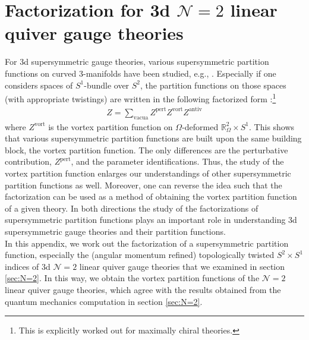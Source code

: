 \documentclass[a4paper,11pt]{article}
\begin{document}
\appendix

\section{Factorization for 3d $\mathcal N = 2$ linear quiver gauge theories}
\label{sec:fact}

For 3d supersymmetric gauge theories, various supersymmetric partition functions on curved 3-manifolds have been studied, e.g., \cite{Kim:2009wb,Kapustin:2009kz,Jafferis:2010un,Hama:2010av,Imamura:2011su,Hama:2011ea,Kapustin:2011jm,Benini:2011nc,Imamura:2011wg,Alday:2012au,Benini:2015noa,Benini:2016hjo,Closset:2016arn}. Especially if one considers spaces of $S^1$-bundle over $S^2$, the partition functions on those spaces (with appropriate twistings) are written in the following factorized form \cite{Krattenthaler:2011da,Dimofte:2011ju,Pasquetti:2011fj,Beem:2012mb,Hwang:2012jh,Taki:2013opa,Cecotti:2013mba,Fujitsuka:2013fga,Benini:2013yva,Benini:2015noa}:\footnote{This is explicitly worked out for maximally chiral \cite{Benini:2011mf} theories.}
\begin{align}
Z = \sum_\text{vacua} Z^\text{pert} Z^\text{vort} Z^\text{antiv}
\end{align}
where $Z^\text{vort}$ is the vortex partition function on $\Omega$-deformed $\mathbb R^2_\Omega \times S^1$. This shows that various supersymmetric partition functions are built upon the same building block, the vortex partition function. The only differences are the perturbative contribution, $Z^\text{pert}$, and the parameter identifications. Thus, the study of the vortex partition function enlarges our understandings of other supersymmetric partition functions as well. Moreover, one can reverse the idea such that the factorization can be used as a method of obtaining the vortex partition function of a given theory. In both directions the study of the factorizations of supersymmetric partition functions plays an important role in understanding 3d supersymmetric gauge theories and their partition functions.
\\


In this appendix, we work out the factorization of a supersymmetric partition function, especially the (angular momentum refined) topologically twisted $S^2 \times S^1$ indices \cite{Benini:2015noa} of 3d $\mathcal N = 2$ linear quiver gauge theories that we examined in section \ref{sec:N=2}. In this way, we obtain the vortex partition functions of the $\mathcal N = 2$ linear quiver gauge theories, which agree with the results obtained from the quantum mechanics computation in section \ref{sec:N=2}.
\end{document}
